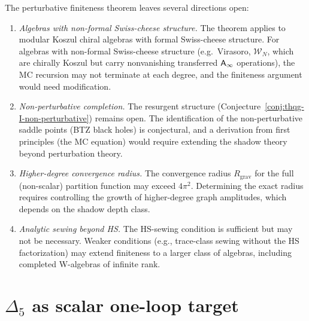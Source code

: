\begin{remark}
\label{rem:thqg-I-open-directions}
The perturbative finiteness theorem leaves several directions open:
\begin{enumerate}[label=\textup{(\arabic*)}]
\item \emph{Algebras with non-formal Swiss-cheese structure.} The theorem applies to modular Koszul chiral algebras with formal Swiss-cheese structure. For algebras with non-formal Swiss-cheese structure (e.g.\ Virasoro, $\mathcal{W}_N$, which are chirally Koszul but carry nonvanishing transferred $\mathsf{A}_{\infty}$ operations), the MC recursion may not terminate at each degree, and the finiteness argument would need modification.
\item \emph{Non-perturbative completion.} The resurgent structure (Conjecture~\ref{conj:thqg-I-non-perturbative}) remains open. The identification of the non-perturbative saddle points (BTZ black holes) is conjectural, and a derivation from first principles (the MC equation) would require extending the shadow theory beyond perturbation theory.
\item \emph{Higher-degree convergence radius.} The convergence radius $R_{\mathrm{grav}}$ for the full (non-scalar) partition function may exceed $4\pi^2$. Determining the exact radius requires controlling the growth of higher-degree graph amplitudes, which depends on the shadow depth class.
\item \emph{Analytic sewing beyond HS.} The HS-sewing condition is sufficient but may not be necessary. Weaker conditions (e.g., trace-class sewing without the HS factorization) may extend finiteness to a larger class of algebras, including completed W-algebras of infinite rank.
\end{enumerate}
\end{remark}

\section{$\Delta_5$ as scalar one-loop target}
\label{sec:thqg-pf-supplement}

